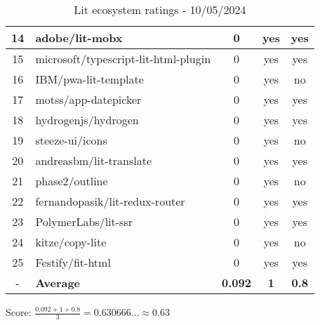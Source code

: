 \begin{table}[H]
{\begin{tabular}{|c|l|c|c|c|}
            14 & adobe/lit-mobx                             & 0                  & yes                        & yes                \\ \hline
            15 & microsoft/typescript-lit-html-plugin       & 0                  & yes                        & yes                \\ \hline
            16 & IBM/pwa-lit-template                       & 0                  & yes                        & no                 \\ \hline
            17 & motss/app-datepicker                       & 0                  & yes                        & yes                \\ \hline
            18 & hydrogenjs/hydrogen                        & 0                  & yes                        & yes                \\ \hline
            19 & steeze-ui/icons                            & 0                  & yes                        & no                 \\ \hline
            20 & andreasbm/lit-translate                    & 0                  & yes                        & yes                \\ \hline
            21 & phase2/outline                             & 0                  & yes                        & no                 \\ \hline
            22 & fernandopasik/lit-redux-router             & 0                  & yes                        & yes                \\ \hline
            23 & PolymerLabs/lit-ssr                        & 0                  & yes                        & yes                \\ \hline
            24 & kitze/copy-lite                            & 0                  & yes                        & no                 \\ \hline
            25 & Festify/fit-html                           & 0                  & yes                        & yes                \\ \hline
            -  & \textbf{Average}                           & \textbf{0.092}     & \textbf{1}                 & \textbf{0.8}       \\ \hline
        \end{tabular}
    }
    \caption{Lit ecosystem ratings - 10/05/2024}
    \label{tab:metrics:lit:ratings}
\end{table}

Score: $\frac{0.092 + 1 + 0.8}{3} = 0.630666\dots \approx 0.63$



